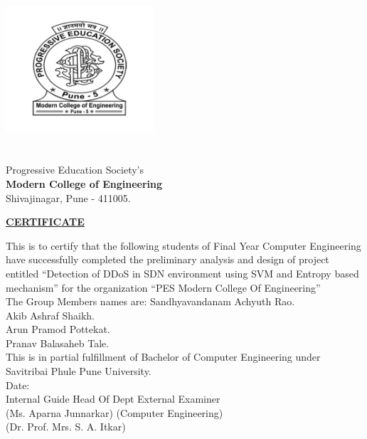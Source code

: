 \documentclass[12pt,a4paper,final]{report}
\begin{document}
\thispagestyle{empty}
\vspace*{1.3cm}
\begin{center}
\includegraphics[width=5.5cm, height=6cm]{logo.png}
\end{center}
\begin{center}
\Large
Progressive Education Society's \\
\textbf{Modern College of Engineering} \\
Shivajinagar, Pune - 411005. \\
\vspace{1cm}

\underline{\textbf{CERTIFICATE}}
\end{center}
\normalsize
\vspace{0.5cm}
This is to certify that the following students of Final Year Computer Engineering have successfully completed the preliminary analysis and design of project entitled ``Detection of DDoS in SDN environment using SVM and Entropy based mechanism'' for the organization ``PES Modern College Of Engineering'' \\
The Group Members names are: \hspace{0.1cm} Sandhyavandanam Achyuth Rao. \\\hspace*{5.7cm} Akib Ashraf Shaikh. \\
\hspace*{5.7cm} Arun Pramod Pottekat. \\
\hspace*{5.7cm} Pranav Balasaheb Tale. \vspace{1cm}\\
This is in partial fulfillment of Bachelor of Computer Engineering under Savitribai Phule Pune University. \vspace{1cm}\\
Date: \vspace{2cm} \\
\hspace*{0.8cm}Internal Guide 	 
\hspace{3.95cm}Head Of Dept
\hspace{3.5cm}External Examiner \\
(Ms. Aparna Junnarkar)
\hspace*{2.3cm}(Computer Engineering) \\
\hspace*{6.3cm}(Dr. Prof. Mrs. S. A. Itkar) \\
\end{document}
